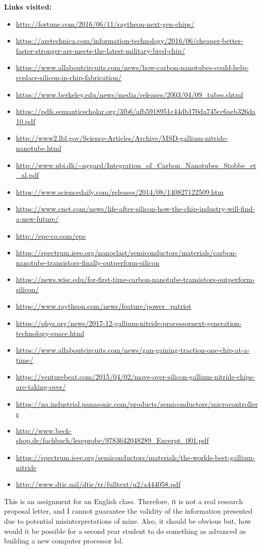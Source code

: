 \documentclass[letterpaper]{letter}
\begin{document}
\textbf{Links visited:}
\begin{itemize}
  \item \url{http://fortune.com/2016/06/11/raytheon-next-gen-chips/}
  \item \url{https://arstechnica.com/information-technology/2016/06/cheaper-better-faster-stronger-ars-meets-the-latest-military-bred-chip/}
  \item \url{https://www.allaboutcircuits.com/news/how-carbon-nanotubes-could-help-replace-silicon-in-chip-fabrication/}
  \item \url{https://www.berkeley.edu/news/media/releases/2003/04/09_tubes.shtml}
  \item \url{https://pdfs.semanticscholar.org/3fb6/afb5918951c44db170da745cc6aeb326da10.pdf}
  \item \url{http://www2.lbl.gov/Science-Articles/Archive/MSD-gallium-nitride-nanotube.html}
  \item \url{http://www.nbi.dk/~nygard/Integration_of_Carbon_Nanotubes_Stobbe_et_al.pdf}
  \item \url{https://www.sciencedaily.com/releases/2014/08/140827122509.htm}
  \item \url{https://www.cnet.com/news/life-after-silicon-how-the-chip-industry-will-find-a-new-future/}
  \item \url{http://epc-co.com/epc}
  \item \url{https://spectrum.ieee.org/nanoclast/semiconductors/materials/carbon-nanotube-transistors-finally-outperform-silicon}
  \item \url{https://news.wisc.edu/for-first-time-carbon-nanotube-transistors-outperform-silicon/}
  \item \url{https://www.raytheon.com/news/feature/power_patriot}
  \item \url{https://phys.org/news/2017-12-gallium-nitride-processornext-generation-technology-space.html}
  \item \url{https://www.allaboutcircuits.com/news/gan-gaining-traction-one-chip-at-a-time/}
  \item \url{https://venturebeat.com/2015/04/02/move-over-silicon-gallium-nitride-chips-are-taking-over/}
  \item \url{https://na.industrial.panasonic.com/products/semiconductors/microcontrollers}
  \item \url{http://www.beck-shop.de/fachbuch/leseprobe/9783642048289_Excerpt_001.pdf}
  \item \url{https://spectrum.ieee.org/semiconductors/materials/the-worlds-best-gallium-nitride}
  \item \url{http://www.dtic.mil/dtic/tr/fulltext/u2/a444058.pdf}
\end{itemize}
\vspace*{\fill}
This is an assignment for an English class. Therefore, it is not a real research
proposal letter, and I cannot guarantee the validity of the information
presented due to potential misinterpretations of mine. Also, it should be
obvious but, how would it be possible for a second year student to do something
as advanced as building a new computer processor lol.
\end{document}

